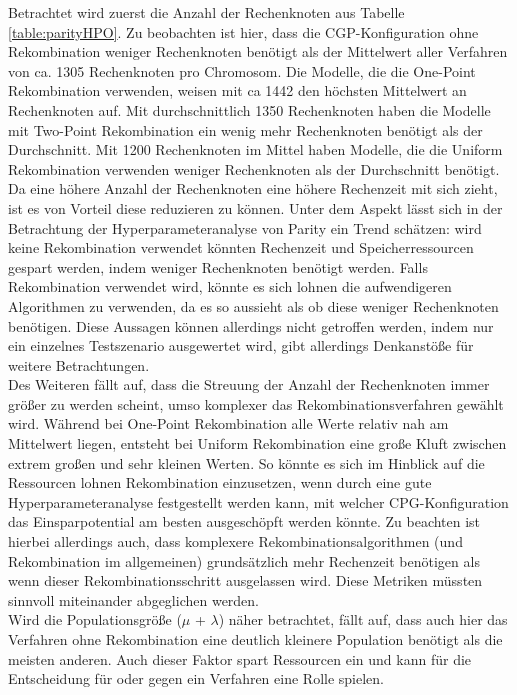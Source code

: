 Betrachtet wird zuerst die Anzahl der Rechenknoten aus Tabelle \ref{table:parityHPO}. 
Zu beobachten ist hier, dass die CGP-Konfiguration ohne Rekombination weniger Rechenknoten benötigt als der Mittelwert aller Verfahren von ca. 1305 Rechenknoten pro Chromosom.
Die Modelle, die die One-Point Rekombination verwenden, weisen mit ca 1442 den höchsten Mittelwert an Rechenknoten auf.
Mit durchschnittlich 1350 Rechenknoten haben die Modelle mit Two-Point Rekombination ein wenig mehr Rechenknoten benötigt als der Durchschnitt.
Mit 1200 Rechenknoten im Mittel haben Modelle, die die Uniform Rekombination verwenden weniger Rechenknoten als der Durchschnitt benötigt.
Da eine höhere Anzahl der Rechenknoten eine höhere Rechenzeit mit sich zieht, ist es von Vorteil diese reduzieren zu können.
Unter dem Aspekt lässt sich in der Betrachtung der Hyperparameteranalyse von Parity ein Trend schätzen: wird keine Rekombination verwendet könnten Rechenzeit und Speicherressourcen gespart werden, indem weniger Rechenknoten benötigt werden. 
Falls Rekombination verwendet wird, könnte es sich lohnen die aufwendigeren Algorithmen zu verwenden, da es so aussieht als ob diese weniger Rechenknoten benötigen.
Diese Aussagen können allerdings nicht getroffen werden, indem nur ein einzelnes Testszenario ausgewertet wird, gibt allerdings Denkanstöße für weitere Betrachtungen.\\
Des Weiteren fällt auf, dass die Streuung der Anzahl der Rechenknoten immer größer zu werden scheint, umso komplexer das Rekombinationsverfahren gewählt wird. 
Während bei One-Point Rekombination alle Werte relativ nah am Mittelwert liegen, entsteht bei Uniform Rekombination eine große Kluft zwischen extrem großen und sehr kleinen Werten. 
So könnte es sich im Hinblick auf die Ressourcen lohnen Rekombination einzusetzen, wenn durch eine gute Hyperparameteranalyse festgestellt werden kann, mit welcher CPG-Konfiguration das Einsparpotential am besten ausgeschöpft werden könnte.
Zu beachten ist hierbei allerdings auch, dass komplexere Rekombinationsalgorithmen (und Rekombination im allgemeinen) grundsätzlich mehr Rechenzeit benötigen als wenn dieser Rekombinationsschritt ausgelassen wird.
Diese Metriken müssten sinnvoll miteinander abgeglichen werden.\\
Wird die Populationsgröße ($\mu$ + $\lambda$) näher betrachtet, fällt auf, dass auch hier das Verfahren ohne Rekombination eine deutlich kleinere Population benötigt als die meisten anderen.
Auch dieser Faktor spart Ressourcen ein und kann für die Entscheidung für oder gegen ein Verfahren eine Rolle spielen.
